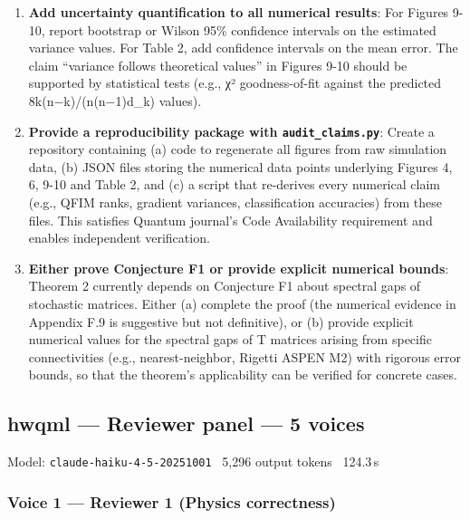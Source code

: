 \documentclass[10pt,letterpaper]{article}
\begin{document}
\begin{enumerate}
\def\labelenumi{\arabic{enumi}.}
\item
  \textbf{Add uncertainty quantification to all numerical results}: For Figures 9-10, report bootstrap or Wilson 95\% confidence intervals on the estimated variance values. For Table 2, add confidence intervals on the mean error. The claim ``variance follows theoretical values'' in Figures 9-10 should be supported by statistical tests (e.g., χ² goodness-of-fit against the predicted 8k(n−k)/(n(n−1)d\_k) values).
\item
  \textbf{Provide a reproducibility package with \texttt{audit\_claims.py}}: Create a repository containing (a) code to regenerate all figures from raw simulation data, (b) JSON files storing the numerical data points underlying Figures 4, 6, 9-10 and Table 2, and (c) a script that re-derives every numerical claim (e.g., QFIM ranks, gradient variances, classification accuracies) from these files. This satisfies Quantum journal's Code Availability requirement and enables independent verification.
\item
  \textbf{Either prove Conjecture F1 or provide explicit numerical bounds}: Theorem 2 currently depends on Conjecture F1 about spectral gaps of stochastic matrices. Either (a) complete the proof (the numerical evidence in Appendix F.9 is suggestive but not definitive), or (b) provide explicit numerical values for the spectral gaps of T matrices arising from specific connectivities (e.g., nearest-neighbor, Rigetti ASPEN M2) with rigorous error bounds, so that the theorem's applicability can be verified for concrete cases.
\end{enumerate}


\subsection{hwqml --- Reviewer panel — 5 voices}
\noindent\textcolor{muted}{\small Model: \texttt{claude-haiku-4-5-20251001} \textperiodcentered\ 5,296 output tokens \textperiodcentered\ 124.3\,s}

\hypertarget{voice-1-reviewer-1-physics-correctness}{%
\subsubsection{Voice 1 --- Reviewer 1 (Physics correctness)}\label{voice-1-reviewer-1-physics-correctness}}
\end{document}

